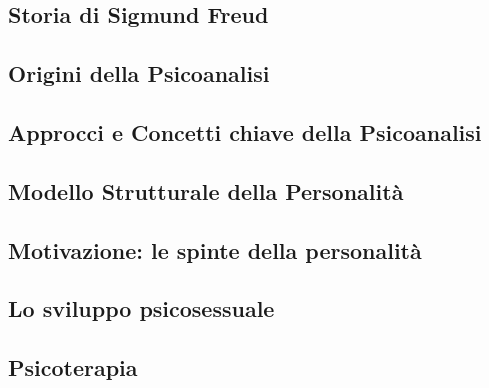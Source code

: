 \documentclass{subfiles}
\begin{document}
\subsection{Storia di Sigmund Freud}


\subsection{Origini della Psicoanalisi}


\subsection{Approcci e Concetti chiave della Psicoanalisi}


\subsection{Modello Strutturale della Personalità}


\subsection{Motivazione: le spinte della personalità}


\subsection{Lo sviluppo psicosessuale}


\subsection{Psicoterapia}


\clearpage
\end{document}
